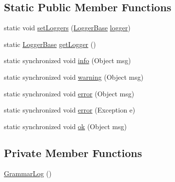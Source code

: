 \subsection*{Static Public Member Functions}
\begin{DoxyCompactItemize}
\item 
static void \hyperlink{classit_1_1emarolab_1_1cagg_1_1core_1_1evaluation_1_1semanticGrammar_1_1GrammarLog_a4fce95c750bf03b2fc02066a09503766}{set\-Loggers} (\hyperlink{classit_1_1emarolab_1_1cagg_1_1debugging_1_1DebuggingText_1_1LoggerBase}{Logger\-Base} \hyperlink{classit_1_1emarolab_1_1cagg_1_1core_1_1evaluation_1_1semanticGrammar_1_1GrammarLog_a67a707ca40df44b86cdce67f8f692b3d}{logger})
\item 
static \hyperlink{classit_1_1emarolab_1_1cagg_1_1debugging_1_1DebuggingText_1_1LoggerBase}{Logger\-Base} \hyperlink{classit_1_1emarolab_1_1cagg_1_1core_1_1evaluation_1_1semanticGrammar_1_1GrammarLog_a6c538d7cd3df428f0b78498e7c486ac7}{get\-Logger} ()
\item 
static synchronized void \hyperlink{classit_1_1emarolab_1_1cagg_1_1core_1_1evaluation_1_1semanticGrammar_1_1GrammarLog_a86e433d1b47400bbff539aca47393c2e}{info} (Object msg)
\item 
static synchronized void \hyperlink{classit_1_1emarolab_1_1cagg_1_1core_1_1evaluation_1_1semanticGrammar_1_1GrammarLog_a9b249f2611a124a7c21c935c3ce39fe7}{warning} (Object msg)
\item 
static synchronized void \hyperlink{classit_1_1emarolab_1_1cagg_1_1core_1_1evaluation_1_1semanticGrammar_1_1GrammarLog_a6bfa2eaa1d6c866b2302af6c4b206587}{error} (Object msg)
\item 
static synchronized void \hyperlink{classit_1_1emarolab_1_1cagg_1_1core_1_1evaluation_1_1semanticGrammar_1_1GrammarLog_a25ab2d3bdad14c105f5621f4d7c7657b}{error} (Exception e)
\item 
static synchronized void \hyperlink{classit_1_1emarolab_1_1cagg_1_1core_1_1evaluation_1_1semanticGrammar_1_1GrammarLog_a09346c87bc1a0fca047c70d04d77b231}{ok} (Object msg)
\end{DoxyCompactItemize}
\subsection*{Private Member Functions}
\begin{DoxyCompactItemize}
\item 
\hyperlink{classit_1_1emarolab_1_1cagg_1_1core_1_1evaluation_1_1semanticGrammar_1_1GrammarLog_a9e4bb2478b3a05ccf54f3e8649567308}{Grammar\-Log} ()
\end{DoxyCompactItemize}
